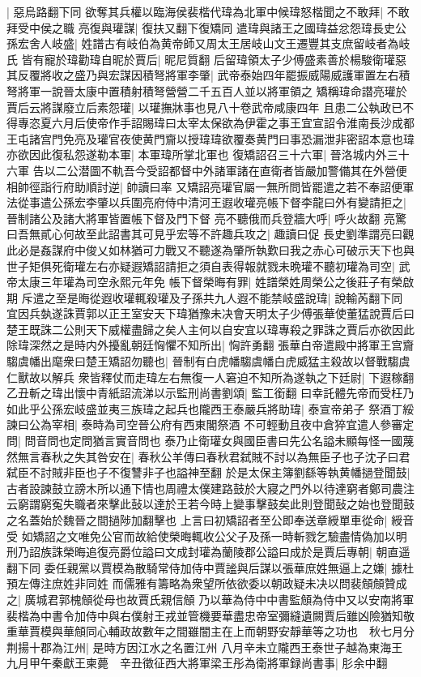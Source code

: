 |{
	惡烏路翻下同}
欲奪其兵權以臨海侯裴楷代瑋為北軍中候瑋怒楷聞之不敢拜|{
	不敢拜受中侯之職}
亮復與瓘謀|{
	復扶又翻下復矯同}
遣瑋與諸王之國瑋益忿怨瑋長史公孫宏舍人岐盛|{
	姓譜古有岐伯為黄帝師又周太王居岐山文王遷豐其支庶留岐者為岐氏}
皆有寵於瑋勸瑋自昵於賈后|{
	昵尼質翻}
后留瑋領太子少傅盛素善於楊駿衛瓘惡其反覆將收之盛乃與宏謀因積弩將軍李肇|{
	武帝泰始四年罷振威陽威護軍置左右積弩將軍一說晉太康中置積射積弩營營二千五百人並以將軍領之}
矯稱瑋命譛亮瓘於賈后云將謀廢立后素怨瓘|{
	以瓘撫牀事也見八十卷武帝咸康四年}
且患二公執政已不得專恣夏六月后使帝作手詔賜瑋曰太宰太保欲為伊霍之事王宜宣詔令淮南長沙成都王屯諸宫門免亮及瓘官夜使黄門齎以授瑋瑋欲覆奏黄門曰事恐漏泄非密詔本意也瑋亦欲因此復私怨遂勒本軍|{
	本軍瑋所掌北軍也}
復矯詔召三十六軍|{
	晉洛城内外三十六軍}
告以二公潜圖不軌吾今受詔都督中外諸軍諸在直衛者皆嚴加警備其在外營便相帥徑詣行府助順討逆|{
	帥讀曰率}
又矯詔亮瓘官屬一無所問皆罷遣之若不奉詔便軍法從事遣公孫宏李肇以兵圍亮府侍中清河王遐收瓘亮帳下督李龍曰外有變請拒之|{
	晉制諸公及諸大將軍皆置帳下督及門下督}
亮不聽俄而兵登牆大呼|{
	呼火故翻}
亮驚曰吾無貳心何故至此詔書其可見乎宏等不許趣兵攻之|{
	趣讀曰促}
長史劉準謂亮曰觀此必是姦謀府中俊乂如林猶可力戰又不聽遂為肇所執歎曰我之赤心可破示天下也與世子矩俱死衛瓘左右亦疑遐矯詔請拒之須自表得報就戮未晩瓘不聽初瓘為司空|{
	武帝太康三年瓘為司空永熙元年免}
帳下督榮晦有罪|{
	姓譜榮姓周榮公之後莊子有榮啟期}
斥遣之至是晦從遐收瓘輒殺瓘及子孫共九人遐不能禁岐盛說瑋|{
	說輸芮翻下同}
宜因兵埶遂誅賈郭以正王室安天下瑋猶豫未决會天明太子少傅張華使董猛說賈后曰楚王既誅二公則天下威權盡歸之矣人主何以自安宜以瑋專殺之罪誅之賈后亦欲因此除瑋深然之是時内外擾亂朝廷恟懼不知所出|{
	恟許勇翻}
張華白帝遣殿中將軍王宫齎騶虞幡出麾衆曰楚王矯詔勿聽也|{
	晉制有白虎幡騶虞幡白虎威猛主殺故以督戰騶虞仁獸故以解兵}
衆皆釋仗而走瑋左右無復一人窘迫不知所為遂執之下廷尉|{
	下遐稼翻}
乙丑斬之瑋出懷中青紙詔流涕以示監刑尚書劉頌|{
	監工銜翻}
曰幸託體先帝而受枉乃如此乎公孫宏岐盛並夷三族瑋之起兵也隴西王泰嚴兵將助瑋|{
	泰宣帝弟子}
祭酒丁綏諫曰公為宰相|{
	泰時為司空晉公府有西東閣祭酒}
不可輕動且夜中倉猝宜遣人參審定問|{
	問音問也定問猶言實音問也}
泰乃止衛瓘女與國臣書曰先公名謚未顯每怪一國蔑然無言春秋之失其咎安在|{
	春秋公羊傳曰春秋君弑賊不討以為無臣子也子沈子曰君弑臣不討賊非臣也子不復讐非子也謚神至翻}
於是太保主簿劉繇等執黄幡撾登聞鼓|{
	古者設諫鼓立謗木所以通下情也周禮太僕建路鼓於大寢之門外以待達窮者鄭司農注云窮謂窮寃失職者來擊此鼔以達於王若今時上變事擊鼓矣此則登聞鼔之始也登聞鼓之名蓋始於魏晉之間撾陟加翻擊也}
上言曰初矯詔者至公即奉送章綬單車從命|{
	綬音受}
如矯詔之文唯免公官而故給使榮晦輒收公父子及孫一時斬戮乞驗盡情偽加以明刑乃詔族誅榮晦追復亮爵位謚曰文成封瓘為蘭陵郡公謚曰成於是賈后專朝|{
	朝直遥翻下同}
委任親黨以賈模為散騎常侍加侍中賈謐與后謀以張華庶姓無逼上之嫌|{
	據杜預左傳注庶姓非同姓}
而儒雅有籌略為衆望所依欲委以朝政疑未决以問裴頠頠贊成之|{
	廣城君郭槐頠從母也故賈氏親信頠}
乃以華為侍中中書監頠為侍中又以安南將軍裴楷為中書令加侍中與右僕射王戎並管機要華盡忠帝室彌縫遺闕賈后雖凶險猶知敬重華賈模與華頠同心輔政故數年之間雖闇主在上而朝野安靜華等之功也　秋七月分荆揚十郡為江州|{
	是時方因江水之名置江州}
八月辛未立隴西王泰世子越為東海王　九月甲午秦獻王柬薨　辛丑徵征西大將軍梁王彤為衛將軍録尚書事|{
	肜余中翻}


